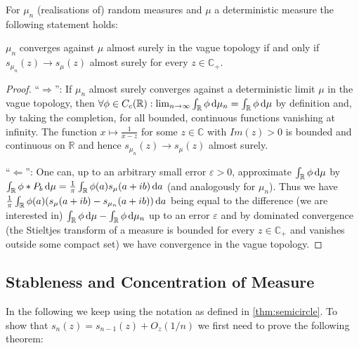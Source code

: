 \begin{theorem}
	For $\mu_n$ (realisations of) random measures and $\mu$ a deterministic measure the following statement holds:
	
	$\mu_n$ converges against $\mu$ almost surely in the vague topology if and only if $s_{\mu_n}(z)\rightarrow s_\mu(z)$ almost surely for every $z\in\mathbb C_+$.
\end{theorem}

\begin{proof}

	``$\Rightarrow$'': If $\mu_n$ almost surely converges against a deterministic limit $\mu$ in the vague topology, then $\forall \phi\in C_c(\mathbb R): \lim_{n\rightarrow\infty}\int_\mathbb{R}\phi \mathop{}\!\mathrm{d}\mu_n=\int_\mathbb{R}\phi \mathop{}\!\mathrm{d}\mu$ by definition and, by taking the completion, for all bounded, continuous functions vanishing at infinity. The function $x\mapsto \frac{1}{x-z}$ for some $z\in\mathbb C$ with $Im(z)>0$ is bounded and continuous on $\mathbb R$ and hence $s_{\mu_n}(z)\rightarrow s_\mu(z)$ almost surely.
	
	``$\Leftarrow$'': One can, up to an arbitrary small error $\varepsilon>0$, approximate $\int_\mathbb{R}\phi\mathop{}\!\mathrm{d}\mu$ by $\int_\mathbb{R}\phi*P_b \mathop{}\!\mathrm{d}\mu = \frac{1}{\pi}\int_\mathbb{R}\phi(a)s_\mu(a+ib)\mathop{}\!\mathrm{d} a$ (and analogously for $\mu_n$).
	Thus we have $\frac{1}{\pi}\int_\mathbb{R}\phi(a)(s_\mu(a+ib)-s_{\mu_n}(a+ib))\mathop{}\!\mathrm{d} a$ being equal to the difference (we are interested in) $\int_\mathbb{R}\phi\mathop{}\!\mathrm{d}\mu - \int_\mathbb{R}\phi\mathop{}\!\mathrm{d}\mu_n$ up to an error $\varepsilon$ and by dominated convergence (the Stieltjes transform of a measure is bounded for every $z\in \mathbb C_+$ and vanishes outside some compact set) we have convergence in the vague topology.
\end{proof}

\subsection{Stableness and Concentration of Measure}
In the following we keep using the notation as defined in \ref{thm:semicircle}. To show that $s_n(z)=s_{n-1}(z)+O_z(1/n)$ we first need to prove the following theorem:

